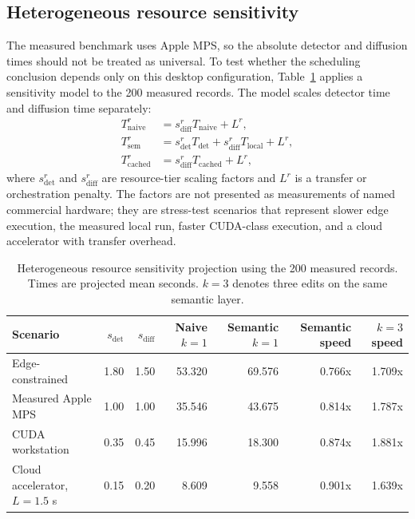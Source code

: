 \documentclass[final,5p,times,number,sort&compress]{elsarticle}
\begin{document}
\subsection{Heterogeneous resource sensitivity}

The measured benchmark uses Apple MPS, so the absolute detector and diffusion times should not be treated as universal. To test whether the scheduling conclusion depends only on this desktop configuration, Table~\ref{tab:hetero-sim} applies a sensitivity model to the 200 measured records. The model scales detector time and diffusion time separately:
\begin{align}
    T^{r}_{\mathrm{naive}} &= s^r_{\mathrm{diff}} T_{\mathrm{naive}} + L^r, \\
    T^{r}_{\mathrm{sem}} &= s^r_{\mathrm{det}}T_{\mathrm{det}} + s^r_{\mathrm{diff}}T_{\mathrm{local}} + L^r, \\
    T^{r}_{\mathrm{cached}} &= s^r_{\mathrm{diff}}T_{\mathrm{cached}} + L^r,
\end{align}
where \(s^r_{\mathrm{det}}\) and \(s^r_{\mathrm{diff}}\) are resource-tier scaling factors and \(L^r\) is a transfer or orchestration penalty. The factors are not presented as measurements of named commercial hardware; they are stress-test scenarios that represent slower edge execution, the measured local run, faster CUDA-class execution, and a cloud accelerator with transfer overhead.

\begin{table}[t]
\centering
\small
\caption{Heterogeneous resource sensitivity projection using the 200 measured records. Times are projected mean seconds. \(k=3\) denotes three edits on the same semantic layer.}
\label{tab:hetero-sim}
\begin{tabular}{lrrrrrr}
\toprule
Scenario & \(s_{\mathrm{det}}\) & \(s_{\mathrm{diff}}\) & Naive \(k=1\) & Semantic \(k=1\) & Semantic speed & \(k=3\) speed \\
\midrule
Edge-constrained & 1.80 & 1.50 & 53.320 & 69.576 & 0.766x & 1.709x \\
Measured Apple MPS & 1.00 & 1.00 & 35.546 & 43.675 & 0.814x & 1.787x \\
CUDA workstation & 0.35 & 0.45 & 15.996 & 18.300 & 0.874x & 1.881x \\
Cloud accelerator, \(L=1.5\) s & 0.15 & 0.20 & 8.609 & 9.558 & 0.901x & 1.639x \\
\bottomrule
\end{tabular}
\end{table}
\end{document}
